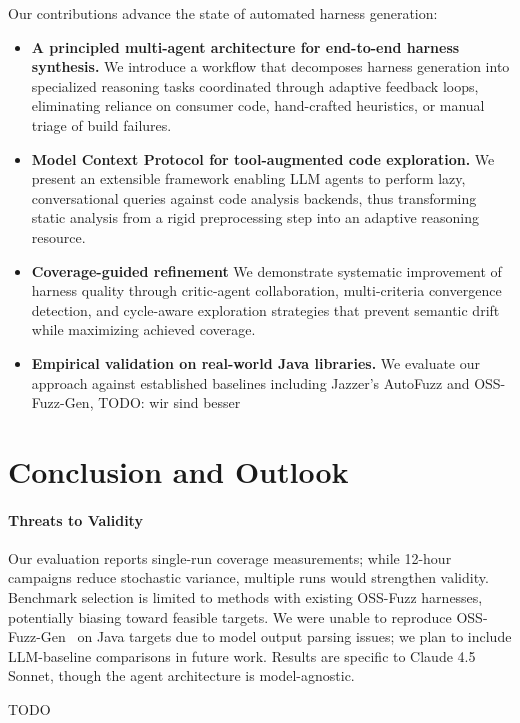 \documentclass[sigconf,review,anonymous]{acmart}
\begin{document}
Our contributions advance the state of automated harness generation:
\begin{itemize}
    \item \textbf{A principled multi-agent architecture for end-to-end harness synthesis.} We introduce a workflow that decomposes harness generation into specialized reasoning tasks coordinated through adaptive feedback loops, eliminating reliance on consumer code, hand-crafted heuristics, or manual triage of build failures.

    \item \textbf{Model Context Protocol for tool-augmented code exploration.} We present an extensible framework enabling LLM agents to perform lazy, conversational queries against code analysis backends, thus transforming static analysis from a rigid preprocessing step into an adaptive reasoning resource.

    \item \textbf{Coverage-guided refinement} We demonstrate systematic improvement of harness quality through critic-agent collaboration, multi-criteria convergence detection, and cycle-aware exploration strategies that prevent semantic drift while maximizing achieved coverage.

    \item \textbf{Empirical validation on real-world Java libraries.} We evaluate our approach against established baselines including Jazzer's AutoFuzz and OSS-Fuzz-Gen, TODO: wir sind besser
\end{itemize}








\section{Conclusion and Outlook}

\paragraph{Threats to Validity}
Our evaluation reports single-run coverage measurements; while 12-hour campaigns reduce stochastic variance, multiple runs would strengthen validity. Benchmark selection is limited to methods with existing OSS-Fuzz harnesses, potentially biasing toward feasible targets. We were unable to reproduce OSS-Fuzz-Gen~\cite{CITE:OSSFuzzGen} on Java targets due to model output parsing issues; we plan to include LLM-baseline comparisons in future work. Results are specific to Claude 4.5 Sonnet, though the agent architecture is model-agnostic.

TODO




\end{document}
